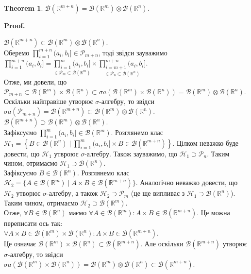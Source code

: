 \documentclass[a4paper, 10pt]{article}
\makeatletter
\theoremstyle{theoremdd}
\newtheorem{theorem}{Theorem}[subsection]
\renewenvironment{proof}[1][Proof.\\]{\par
\pushQED{\hfill \qed}%
\normalfont \topsep6\p@\@plus6\p@\relax
\trivlist
\item\relax
{\bfseries
#1\@addpunct{.}}\hspace\labelsep\ignorespaces
}{%
\popQED\endtrivlist\@endpefalse
}
\makeatother
\begin{document}
\begin{theorem}
$\mathcal{B}(\mathbb{R}^{m+n}) = \mathcal{B}(\mathbb{R}^m) \otimes \mathcal{B}(\mathbb{R}^n)$.
\end{theorem}

\begin{proof}
$\mathcal{B}(\mathbb{R}^{m+n}) \subset \mathcal{B}(\mathbb{R}^m) \otimes \mathcal{B}(\mathbb{R}^n)$.\\
Оберемо $\displaystyle\prod_{i=1}^{m+n} (a_i,b_i] \in \mathcal{P}_{m+n}$, тоді звідси зауважимо $\displaystyle\prod_{i=1}^{m+n} (a_i,b_i] = \underset{\in \mathcal{P}_m \subset \mathcal{B}(\mathbb{R}^m)}{\prod_{i=1}^m (a_i,b_i]} \times \underset{\in \mathcal{P}_n \subset \mathcal{B}(\mathbb{R}^n)}{\prod_{i=m+1}^{m+n} (a_i,b_i]}$.\\
Отже, ми довели, що $\mathcal{P}_{m+n} \subset \mathcal{B}(\mathbb{R}^m) \times \mathcal{B}(\mathbb{R}^n) \subset \sigma a(\mathcal{B}(\mathbb{R}^m) \times \mathcal{B}(\mathbb{R}^n)) = \mathcal{B}(\mathbb{R}^m) \otimes \mathcal{B}(\mathbb{R}^n)$.\\
Оскільки найправіше утворює $\sigma$-алгебру, то звідси $\sigma a(\mathcal{P}_{m+n}) = \mathcal{B}(\mathbb{R}^{m+n}) \subset \mathcal{B}(\mathbb{R}^m) \otimes \mathcal{B}(\mathbb{R}^n)$.
\bigskip \\
$\mathcal{B}(\mathbb{R}^{m+n}) \supset \mathcal{B}(\mathbb{R}^m) \otimes \mathcal{B}(\mathbb{R}^n)$.\\
Зафіксуємо $\displaystyle\prod_{i=1}^m (a_i,b_i] \in \mathcal{B}(\mathbb{R}^m)$. Розглянемо клас $\displaystyle\mathcal{H}_1 = \left\{ B \in \mathcal{B}(\mathbb{R}^n) \mid \prod_{i=1}^m (a_i,b_i] \times B \in \mathcal{B}(\mathbb{R}^{m+n})\right\}$. Цілком неважко буде довести, що $\mathcal{H}_1$ утвроює $\sigma$-алгебру. Також зауважимо, що $\mathcal{H}_1 \supset \mathcal{P}_n$. Таким чином, отримаємо $\mathcal{H}_1 \supset \mathcal{B}(\mathbb{R}^n)$.\\
Зафіксуємо $B \in \mathcal{B}(\mathbb{R}^n)$. Розглянемо клас $\mathcal{H}_2 = \{A \in \mathcal{B}(\mathbb{R}^m) \mid A \times B \in \mathcal{B}(\mathbb{R}^{m+n})\}$. Аналогічно неважко довести, що $\mathcal{H}_2$ утворює $\sigma$-алгебру, а також $\mathcal{H}_2 \supset \mathcal{P}_m$ (це ще випливає з $\mathcal{H}_1 \supset \mathcal{B}(\mathbb{R}^n)$). Таким чином, отримаємо $\mathcal{H}_2 \supset \mathcal{B}(\mathbb{R}^m)$.\\
Отже, $\forall B \in \mathcal{B}(\mathbb{R}^n)$ маємо $\forall A \in \mathcal{B}(\mathbb{R}^m): A \times B \in \mathcal{B}(\mathbb{R}^{m+n})$. Це можна переписати ось так:\\
$\forall A \times B \in \mathcal{B}(\mathbb{R}^m) \times \mathcal{B}(\mathbb{R}^n): A \times B \in \mathcal{B}(\mathbb{R}^{m+n})$.\\
Це означає $\mathcal{B}(\mathbb{R}^m) \times \mathcal{B}(\mathbb{R}^n) \subset \mathcal{B}(\mathbb{R}^{m+n})$. Але оскільки $\mathcal{B}(\mathbb{R}^{m+n})$ утворює $\sigma$-алгебру, то звідси \\ $\sigma a (\mathcal{B}(\mathbb{R}^m) \times \mathcal{B}(\mathbb{R}^n)) = \mathcal{B}(\mathbb{R}^m) \otimes \mathcal{B}(\mathbb{R}^n) \subset \mathcal{B}(\mathbb{R}^{m+n})$.
\end{proof}
\end{document}
